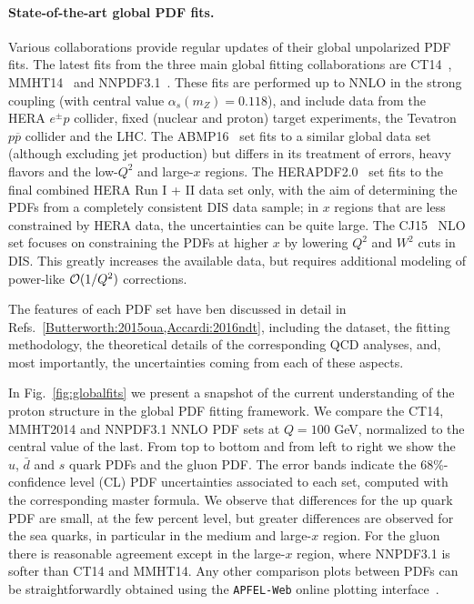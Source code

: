 \paragraph*{State-of-the-art global PDF fits.}
%
Various collaborations provide regular updates of their global unpolarized
PDF fits.
%
The latest fits from the three main global fitting collaborations
are CT14~\cite{Dulat:2015mca}, MMHT14~\cite{Harland-Lang:2014zoa} and
NNPDF3.1~\cite{Ball:2017nwa}.
%
These fits are performed up to NNLO in the strong coupling (with central value
$\alpha_s(m_Z)=0.118$), and include data from the HERA $e^{\pm} p$ collider, 
fixed (nuclear and proton) target experiments, the Tevatron $p\overline{p}$ 
collider and the LHC. 
%
The ABMP16~\cite{Alekhin:2017kpj} set fits to a similar global data set
(although excluding jet production) but differs in its treatment of errors,
 heavy flavors and the low-$Q^2$ and large-$x$ regions.
%
The HERAPDF2.0~\cite{Abramowicz:2015mha} set fits to the final combined HERA 
Run I + II data set only, with the aim of determining the PDFs from a 
completely consistent DIS data sample; in $x$ regions that are less constrained 
by HERA data, the uncertainties can be quite large.
%
The CJ15~\cite{Accardi:2016qay} NLO set focuses on constraining the PDFs at 
higher $x$ by lowering $Q^2$ and $W^2$ cuts in DIS.
%
This greatly increases the available data, but requires additional modeling of 
power-like ${\cal O}(1/Q^2)$ corrections.

The features of each PDF set have ben discussed in detail in 
Refs.~\ref{Butterworth:2015oua,Accardi:2016ndt}, including the 
dataset, the fitting methodology, the theoretical details of the 
corresponding QCD analyses, and, most importantly, the uncertainties
coming from each of these aspects.


In Fig.~\ref{fig:globalfits}
we present a snapshot of the current understanding
of the proton structure in the global PDF fitting framework.
%
We compare the CT14, MMHT2014
and NNPDF3.1 NNLO PDF sets at $Q=100$ GeV, normalized
to the central value of the last.
%
From top to bottom and from left to right we show the
$u$, $\bar{d}$ and $s$ quark PDFs and the gluon PDF.
%
The error bands indicate the 68\%-confidence level (CL) PDF uncertainties
associated to each set, computed with the corresponding master formula.
%
We observe that differences for the up quark PDF
are small, at the few percent level, but greater differences
are observed for the sea quarks, in particular
in the medium and large-$x$ region.
%
For the gluon there is reasonable agreement except in the large-$x$ region, 
where NNPDF3.1 is softer than CT14 and MMHT14.
%
Any other comparison plots between PDFs can be straightforwardly
obtained using the {\tt APFEL-Web} online plotting 
interface~\cite{Carrazza:2014gfa}.

